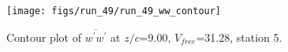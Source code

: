 \begin{figure}[H]
\centering
\texttt{[image: figs/run\_49/run\_49\_ww\_contour]}
\caption{Contour plot of $\overline{w^\prime w^\prime}$ at $z/c$=9.00, $V_{free}$=31.28, station 5.}
\label{fig:run_49_ww_contour}
\end{figure}


